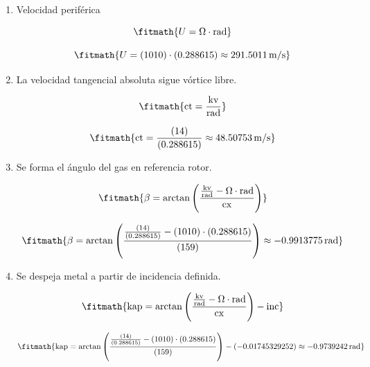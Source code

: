 \begin{enumerate}

\item Velocidad periférica

\[\fitmath{U=\Omega\cdot \mathrm{rad}}\]

\[\fitmath{U=(1010)\cdot (0.288615)\approx 291.5011\,\mathrm{m/s}}\]

\item La velocidad tangencial absoluta sigue vórtice libre.

\[\fitmath{\mathrm{ct}=\frac{\mathrm{kv}}{\mathrm{rad}}}\]

\[\fitmath{\mathrm{ct}=\frac{(14)}{(0.288615)}\approx 48.50753\,\mathrm{m/s}}\]

\item Se forma el ángulo del gas en referencia rotor.

\[\fitmath{\beta=\arctan\left(\frac{\frac{\mathrm{kv}}{\mathrm{rad}}-\Omega\cdot \mathrm{rad}}{\mathrm{cx}}\right)}\]

\[\fitmath{\beta=\arctan\left(\frac{\frac{(14)}{(0.288615)}-(1010)\cdot (0.288615)}{(159)}\right)\approx -0.9913775\,\mathrm{rad}}\]

\item Se despeja metal a partir de incidencia definida.

\[\fitmath{\mathrm{kap}=\arctan\left(\frac{\frac{\mathrm{kv}}{\mathrm{rad}}-\Omega\cdot \mathrm{rad}}{\mathrm{cx}}\right)-\mathrm{inc}}\]

\[\fitmath{\mathrm{kap}=\arctan\left(\frac{\frac{(14)}{(0.288615)}-(1010)\cdot (0.288615)}{(159)}\right)-(-0.01745329252)\approx -0.9739242\,\mathrm{rad}}\]

\end{enumerate}
